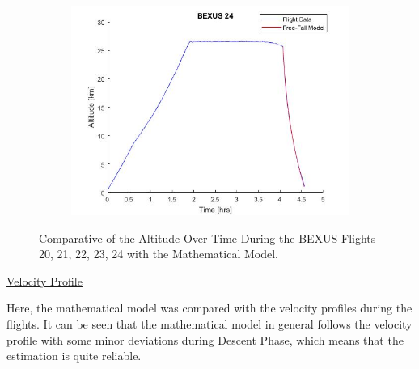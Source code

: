 \begin{figure}[H]
\begin{subfigure}{0.45\textwidth}
    \centering\includegraphics[width=1.1\textwidth]{appendix/img/bexus24mathmodel.png}
  \end{subfigure}
  \caption{Comparative of the Altitude Over Time During the BEXUS Flights 20, 21, 22, 23, 24 with the Mathematical Model.}\label{fig:bexustrajectories}
  \end{figure}
  
 
 
\bigskip
\underline{Velocity Profile}

\smallskip
Here, the mathematical model was compared with the velocity profiles during the flights. It can be seen that the mathematical model in general follows the velocity profile with some minor deviations during Descent Phase, which means that the estimation is quite reliable.

